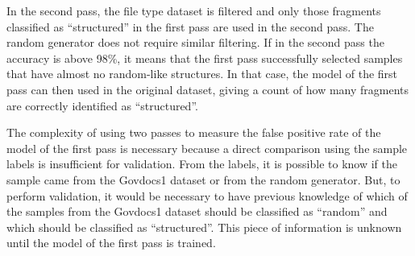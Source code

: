 In the second pass, the file type dataset is filtered and only those fragments classified as ``structured'' in the first pass are used in the second pass. The random generator does not require similar filtering. If in the second pass the accuracy is above 98\%, it means that the first pass successfully selected samples that have almost no random-like structures. In that case, the model of the first pass can then used in the original dataset, giving a count of how many fragments are correctly identified as ``structured''.

The complexity of using two passes to measure the false positive rate of the model of the first pass is necessary because a direct comparison using the sample labels is insufficient for validation. From the labels, it is possible to know if the sample came from the Govdocs1 dataset or from the random generator. But, to perform validation, it would be necessary to have previous knowledge of which of the samples from the Govdocs1 dataset should be classified as ``random'' and which should be classified as ``structured''. This piece of information is unknown until the model of the first pass is trained.
